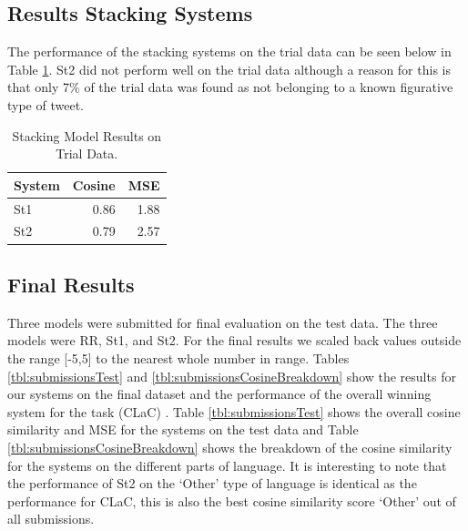 \documentclass[11pt,letterpaper]{article}
\begin{document}
\subsection{Results Stacking Systems}
The performance of the stacking systems on the trial data can be seen below in Table \ref{tbl:stackingResults}. {\sc St2} did not perform well on the trial data although a reason for this is that only 7\% of the trial data was found as not belonging to a known figurative type of tweet.

\begin{table}[ht!]
\begin{center}
\begin{tabular}{|l|r|r|}
\hline
System & Cosine & MSE\\
\hline
{\sc St1} & 0.86 &1.88\\
{\sc St2} & 0.79 & 2.57\\
\hline
\end{tabular}
\end{center}
\caption{Stacking Model Results on Trial Data.}
\label{tbl:stackingResults}
\end{table}
 
\subsection{Final Results} 

Three models were submitted for final evaluation on the test data. The three models were {\sc RR}, {\sc St1}, and {\sc St2}. For the final results we scaled back values outside the range [-5,5] to the nearest whole number in range. 
Tables \ref{tbl:submissionsTest} and \ref{tbl:submissionsCosineBreakdown} show the results for our systems on the final dataset and the performance of the overall winning system for the task ({\sc CLaC}) . Table \ref{tbl:submissionsTest} shows the overall cosine similarity and MSE for the systems on the test data and Table \ref{tbl:submissionsCosineBreakdown} shows the breakdown of the cosine similarity for the systems on the different parts of language. It is interesting to note that the performance of {\sc St2} on the `Other' type of language is identical as the performance for {\sc CLaC}, this is also the best cosine similarity score `Other' out of all submissions.
\end{document}
